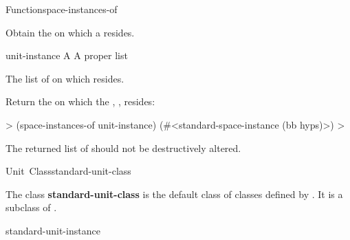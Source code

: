 \documentclass[10pt,twoside,english,pdftex]{article}
\begin{document}

\begin{functiondoc}{Function}{space-instances-of}%
  {
    \returns{} }
%
%

\fnsyntax

\fnpurpose Obtain the  on which a
 resides. 

\fnpackage {}

\fnmodule {}

\fnargs
\begin{args}{unit-instance}
 A 
 A proper list
\end{args}

\fnreturns The list of  on which
 resides.

\fnexample
Return the  on which the ,
, resides:
%
\W\supp
\begin{example}
  > (space-instances-of unit-instance)
  (#<standard-space-instance (bb hyps)>)
  >
\end{example}

\fnnote The returned list of  should not be
destructively altered.

\end{functiondoc}


\begin{functiondoc}{Unit~Class}{standard-unit-class}{}
%
%

\fnsyntax

\fnpackage {}

\fnmodule {}

\fndescription 
{}%
The class \textbf{standard-unit-class} is the default class of classes defined
by \textbf{}.  It is a subclass of
.

\begin{alsos}{standard-unit-instance}
\end{alsos}

\end{functiondoc}
\end{document}
